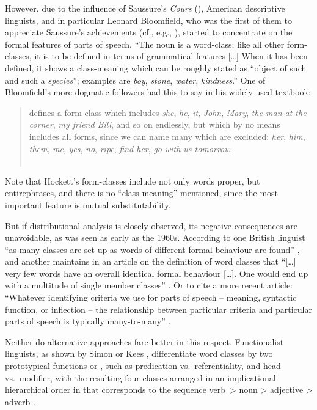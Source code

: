 \documentclass[output=paper]{langsci/langscibook}
\begin{document}
However, due to the influence of Saussure’s \emph{Cours}
(\citeyear{Saussure1916}), American descriptive linguists, and in particular
Leonard Bloomfield, who was the first of them to appreciate Saussure’s
achievements (cf., e.g., \citealt{Koerner1995}), started to concentrate on the
formal features of parts of speech. “The noun is a word-class; like all other
form-classes, it is to be defined in terms of grammatical features [\dots{}] When it
has been defined, it shows a class-meaning which can be roughly stated as
\enquote{object of such and such a \emph{species}}; examples are \emph{boy},
\emph{stone}, \emph{water}, \emph{kindness}.” \citep[202]{Bloomfield1935} One
of Bloomfield’s more dogmatic followers had this to say in his widely used
textbook:

\begin{quote} defines a form-class which
includes \emph{she}, \emph{he}, \emph{it}, \emph{John}, \emph{Mary}, \emph{the
man at the corner}, \emph{my friend Bill}, and so on endlessly, but which by no
means includes all forms, since we can name many which are excluded:
\emph{her}, \emph{him}, \emph{them}, \emph{me}, \emph{yes}, \emph{no},
\emph{ripe}, \emph{find her}, \emph{go with us tomorrow}.\\\hbox{}\hfill%
\hbox{\citep[162]{Hockett1958} }
\end{quote}
Note that Hockett’s form-classes include not only
words proper, but entire\linebreak phrases, and there is no \enquote{class-meaning}
mentioned, since the most important feature is mutual substitutability.\largerpage[2]

But if distributional analysis is closely observed, its negative consequences
are unavoidable, as was seen as early as the 1960s. According to one British
linguist \enquote{as many classes are set up as words of different formal
behaviour are found} \parencite[174]{Robins1980}, and another maintains in an
article on the definition of word classes that “[\dots{}] very few words have
an overall identical formal behaviour [\dots{}]. One would end up with a
multitude of single member classes” \citep[28]{Crystal1967}. Or to cite a more
recent article: “Whatever identifying criteria we use for parts of speech –
meaning, syntactic function, or inflection – the relationship between
particular criteria and particular parts of speech is typically many-to-many”
\citep[3]{Anward2000}.

Neither do alternative approaches fare better in this respect. Functionalist
linguists, as shown by Simon \citet{Dik1989} or Kees \citet{Hengeveld1992},
differentiate word classes by two prototypical functions or , such as
predication vs.\ referentiality, and head vs.\ modifier, with the resulting
four classes arranged in an implicational hierarchical order in 
that corresponds to the sequence verb~> noun > adjective > adverb
\citep{Hengeveld1992}.
\end{document}
